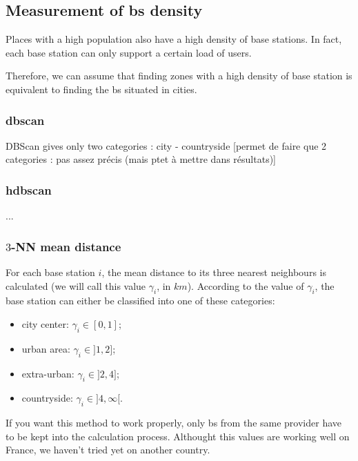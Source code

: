 \documentclass[lettersize,journal,english]{IEEEtran}
\begin{document}
\subsection{Measurement of \acrshort{bs} density}
Places with a high population also have a high density of base stations. In fact, each base station can only support a certain
load of users.

Therefore, we can assume that finding zones with a high density of base station is equivalent to finding the \acrshort{bs} 
situated in \og cities\fg{}.

\subsubsection{\acrshort{dbscan}}
DBScan gives only two categories : city - countryside
[permet de faire que 2 categories : pas assez précis (mais ptet à mettre dans résultats)]


\subsubsection{\acrshort{hdbscan}}
...

\subsubsection{$3$-NN mean distance}
For each base station $i$, the mean distance to its three nearest neighbours is calculated (we will call this value $\gamma_i$, in 
$\unit{km}$). According to the value of $\gamma_i$, the base station can either be classified into one of these categories:
\begin{itemize}
    \item city center: $\gamma_i\in [0,1]$;
    \item urban area: $\gamma_i\in ]1,2]$;
    \item extra-urban: $\gamma_i\in ]2,4]$;
    \item countryside: $\gamma_i\in ]4,\infty[$.
\end{itemize}
If you want this method to work properly, only \acrshort{bs} from the same provider have to be kept into the calculation process.
Althought this values are working well on France, we haven't tried yet on another country.
\end{document}
